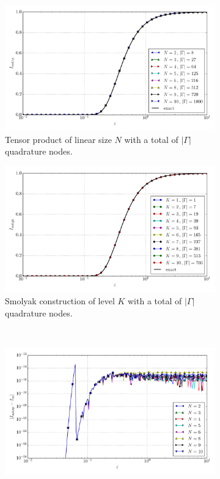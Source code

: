 \documentclass[a4paper,10pt]{article}
\begin{document}
\begin{figure}[ht!]
  \begin{subfigure}[t]{0.5\linewidth}
    \includegraphics[width=\linewidth]{./plots/tp_sg_3d_conv_eps_(0,0,0)_(0,0,0)_val_nsd_tp.pdf}
    \caption{Tensor product of linear size $N$ with a total of $|\Gamma|$ quadrature nodes.}
    \label{fig:tp_sg_3d_conv_eps_000_000_val_nsd_tp}
  \end{subfigure}
  \begin{subfigure}[t]{0.5\linewidth}
    \includegraphics[width=\linewidth]{./plots/tp_sg_3d_conv_eps_(0,0,0)_(0,0,0)_val_nsd_gk.pdf}
    \caption{Smolyak construction of level $K$ with a total of $|\Gamma|$ quadrature nodes.}
    \label{fig:tp_sg_3d_conv_eps_000_000_val_nsd_gk}
  \end{subfigure} \\
  \begin{subfigure}[t]{0.5\linewidth}
    \includegraphics[width=\linewidth]{./plots/tp_sg_3d_conv_eps_(0,0,0)_(0,0,0)_err_nsd_tp.pdf}

\end{subfigure}
\end{figure}
\end{document}
